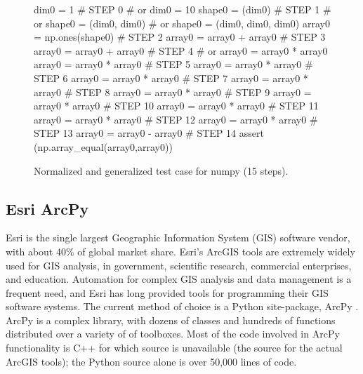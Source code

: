 \begin{figure}
{\scriptsize
\begin{code}
dim0 = 1                            \textcolor{black!60}{\# STEP 0}
\textcolor{black!60}{\#  or dim0 = 10 }
shape0 = (dim0)                     \textcolor{black!60}{\# STEP 1}
\textcolor{black!60}{\#  or shape0 = (dim0, dim0) }
\textcolor{black!60}{\#  or shape0 = (dim0, dim0, dim0) }
array0 = np.ones(shape0)            \textcolor{black!60}{\# STEP 2}
array0 = array0 + array0            \textcolor{black!60}{\# STEP 3}
array0 = array0 + array0            \textcolor{black!60}{\# STEP 4}
\textcolor{black!60}{\#  or array0 = array0 * array0 }
array0 = array0 * array0            \textcolor{black!60}{\# STEP 5}
array0 = array0 * array0            \textcolor{black!60}{\# STEP 6}
array0 = array0 * array0            \textcolor{black!60}{\# STEP 7}
array0 = array0 * array0            \textcolor{black!60}{\# STEP 8}
array0 = array0 * array0            \textcolor{black!60}{\# STEP 9}
array0 = array0 * array0            \textcolor{black!60}{\# STEP 10}
array0 = array0 * array0            \textcolor{black!60}{\# STEP 11}
array0 = array0 * array0            \textcolor{black!60}{\# STEP 12}
array0 = array0 * array0            \textcolor{black!60}{\# STEP 13}
array0 = array0 - array0            \textcolor{black!60}{\# STEP 14}
assert (np.array\_equal(array0,array0))
\end{code}
}
\caption{Normalized and generalized test case for numpy (15 steps).}
\label{numpynormgen}
\end{figure}

\subsection{Esri ArcPy}

Esri is the single
largest Geographic Information System (GIS) software vendor, with about 40\%
of global market share.  Esri's ArcGIS tools are extremely widely
used for GIS analysis, in government, scientific research, commercial
enterprises, and education.  Automation for complex GIS analysis and
data management is a frequent need, and Esri has long provided tools
for programming their GIS software systems.  The current method of
choice is a Python site-package, ArcPy \cite{ArcPy}.  ArcPy is a complex library,
with dozens of classes and hundreds of functions distributed over
a variety of of toolboxes.  Most of the code involved in ArcPy
functionality is C++ for which source is unavailable (the source for
the actual ArcGIS tools); the Python source alone is over 50,000 lines
of code.


